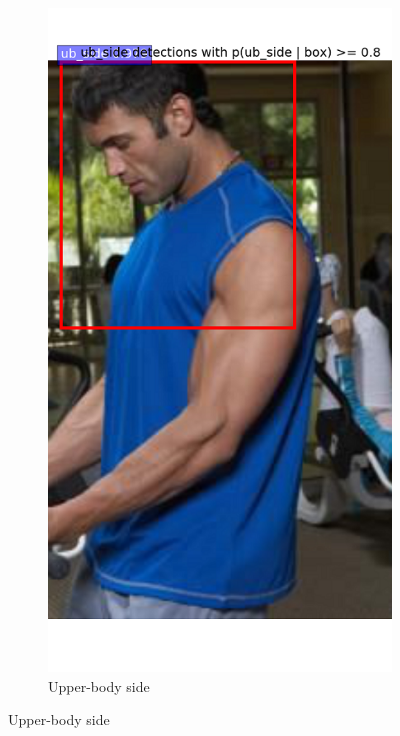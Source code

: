 \documentclass[conference]{IEEEtran}
\begin{document}
\begin{figure}
\begin{subfigure}[b]{0.18\textwidth}
	\end{subfigure}
	~ %
	\begin{subfigure}[b]{0.2\textwidth}
		\includegraphics[width=\textwidth]{ub_side}
		\caption{Upper-body side}

\end{subfigure}
\end{figure}
\end{document}
